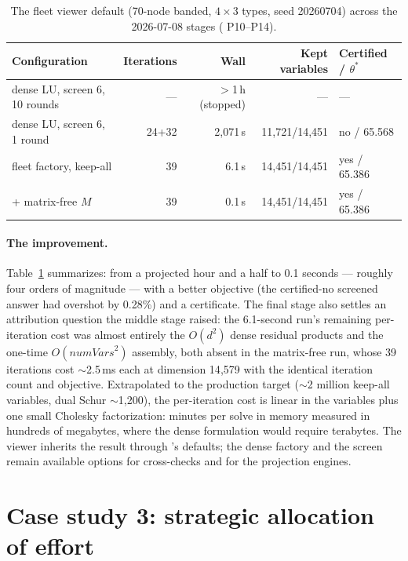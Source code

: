 \begin{table}[htbp]
\centering
\small
\begin{tabular}{lrrrl}
\toprule
\textbf{Configuration} & \textbf{Iterations} & \textbf{Wall} &
\textbf{Kept variables} & \textbf{Certified / $\theta^\ast$} \\
\midrule
dense LU, screen 6, 10 rounds & --- & $>$1\,h (stopped) & --- & --- \\
dense LU, screen 6, 1 round & 24+32 & 2{,}071\,s & 11{,}721/14{,}451
  & no / 65.568 \\
fleet factory, keep-all & 39 & 6.1\,s & 14{,}451/14{,}451
  & yes / 65.386 \\
+ matrix-free $M$ & 39 & 0.1\,s & 14{,}451/14{,}451 & yes / 65.386 \\
\bottomrule
\end{tabular}
\caption{The fleet viewer default (70-node banded, $4 \times 3$ types,
seed 20260704) across the 2026-07-08 stages
( P10--P14).}
\label{tab:fleet}
\end{table}

\paragraph{The improvement.} Table~\ref{tab:fleet} summarizes: from a
projected hour and a half to 0.1 seconds --- roughly four orders of
magnitude --- with a better objective (the certified-no screened answer
had overshot by 0.28\%) and a certificate. The final stage also settles
an attribution question the middle stage raised: the 6.1-second run's
remaining per-iteration cost was almost entirely the $O(d^2)$ dense
residual products and the one-time $O(\mathit{numVars}^2)$ assembly, both
absent in the matrix-free run, whose 39 iterations cost $\sim$2.5\,ms
each at dimension 14{,}579 with the identical iteration count and
objective. Extrapolated to the production target ($\sim$2 million
keep-all variables, dual Schur $\sim$1{,}200), the per-iteration cost is
linear in the variables plus one small Cholesky factorization: minutes
per solve in memory measured in hundreds of megabytes, where the dense
formulation would require terabytes. The viewer inherits the result
through 's defaults; the dense factory and the
screen remain available options for cross-checks and for the projection
engines.

\section{Case study 3: strategic allocation of effort}
\label{sec:t-saoe}

